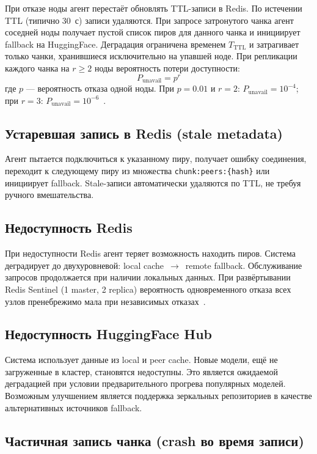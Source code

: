 При отказе ноды агент перестаёт обновлять TTL-записи в Redis. По истечении TTL (типично 30~с) записи удаляются. При запросе затронутого чанка агент соседней ноды получает пустой список пиров для данного чанка и инициирует fallback на HuggingFace. Деградация ограничена временем $T_{\mathrm{TTL}}$ и затрагивает только чанки, хранившиеся исключительно на упавшей ноде. При репликации каждого чанка на $r \geq 2$ ноды вероятность потери доступности:
\[
  P_{\mathrm{unavail}} = p^r
\]
где $p$ --- вероятность отказа одной ноды. При $p = 0.01$ и $r = 2$: $P_{\mathrm{unavail}} = 10^{-4}$; при $r = 3$: $P_{\mathrm{unavail}} = 10^{-6}$~\cite{ford2010availability}.

\subsection*{Устаревшая запись в Redis (stale metadata)}

Агент пытается подключиться к указанному пиру, получает ошибку соединения, переходит к следующему пиру из множества \texttt{chunk:peers:\{hash\}} или инициирует fallback. Stale-записи автоматически удаляются по TTL, не требуя ручного вмешательства.

\subsection*{Недоступность Redis}

При недоступности Redis агент теряет возможность находить пиров. Система деградирует до двухуровневой: local cache~$\to$~remote fallback. Обслуживание запросов продолжается при наличии локальных данных. При развёртывании Redis Sentinel (1 master, 2 replica) вероятность одновременного отказа всех узлов пренебрежимо мала при независимых отказах~\cite{redis_sentinel_docs}.

\subsection*{Недоступность HuggingFace Hub}

Система использует данные из local и peer cache. Новые модели, ещё не загруженные в кластер, становятся недоступны. Это является ожидаемой деградацией при условии предварительного прогрева популярных моделей. Возможным улучшением является поддержка зеркальных репозиториев в качестве альтернативных источников fallback.

\subsection*{Частичная запись чанка (crash во время записи)}

